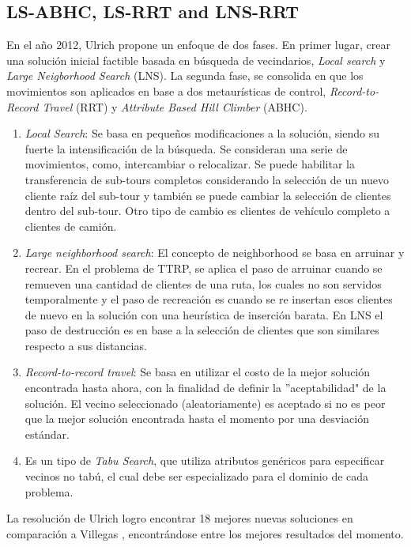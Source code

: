 \documentclass[letter, 10pt]{article}
\begin{document}
\subsection{LS-ABHC, LS-RRT and LNS-RRT}
En el año 2012, Ulrich \cite{Ulrich} propone un enfoque de dos fases. En primer lugar, crear una solución inicial factible basada en búsqueda de vecindarios, \textit{Local search} y \textit{Large Neigborhood Search} (LNS). La segunda fase, se consolida en que los movimientos son aplicados en base a dos metaurísticas de control, \textit{Record-to-Record Travel} (RRT) y \textit{Attribute Based Hill Climber} (ABHC).
\begin{enumerate}
    \item \textit{Local Search}: Se basa en pequeños modificaciones a la solución, siendo su fuerte la intensificación de la búsqueda. Se consideran una serie de movimientos, como, intercambiar o relocalizar. Se puede habilitar la transferencia de sub-tours completos considerando la selección de un nuevo cliente raíz del sub-tour y también se puede cambiar la selección de clientes dentro del sub-tour. Otro tipo de cambio es  clientes de vehículo completo a clientes de camión.\\
    \item \textit{Large neighborhood search}: El concepto de neighborhood se basa en arruinar y recrear. En el problema de TTRP, se aplica el paso de arruinar cuando se remueven una cantidad de clientes de una ruta, los cuales no son servidos temporalmente y el paso de recreación es cuando se re insertan esos clientes de nuevo en la solución con una heurística de inserción barata. En LNS el paso de destrucción es en base a la selección de clientes que son similares respecto a sus distancias.
    \\
    \item \textit{Record-to-record travel}: Se basa en utilizar el costo de la mejor solución encontrada hasta ahora, con la finalidad de definir la ''aceptabilidad" de la solución. El vecino seleccionado (aleatoriamente) es aceptado si no es peor que la mejor solución encontrada hasta el momento por una desviación estándar.
    \\
    \item {} Es un tipo de \textit{Tabu Search}, que utiliza atributos genéricos para especificar vecinos no tabú, el cual debe ser especializado para el dominio de cada problema.
\end{enumerate}
La resolución de Ulrich \cite{Ulrich} logro encontrar 18 mejores nuevas soluciones en comparación a Villegas \cite{Villegas}, encontrándose entre los mejores resultados del momento.\\
\end{document}
